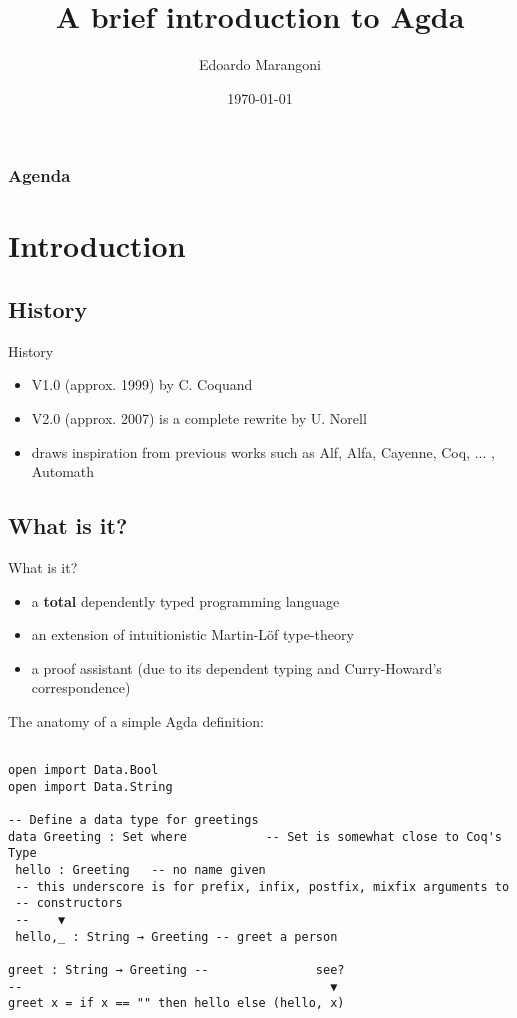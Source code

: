 \documentclass[t,aspectratio=169,9pt]{beamer}
\title{A brief introduction to Agda}
\subtitle{}%
\date{\today}
\author{Edoardo Marangoni}
\begin{document}
\frame[plain]{\titlepage}

\begin{frame}[t,plain]
	\frametitle{Agenda}
	\tableofcontents
\end{frame}

\section[intro]{Introduction}
\subsection[hist]{History}
\begin{frame}{History}
  \vfill
  \begin{itemize}
    \item {V1.0 (approx. 1999) by C. Coquand}
    \item {V2.0 (approx. 2007) is a complete rewrite by U. Norell}
    \item {draws inspiration from previous works such as Alf, Alfa, Cayenne,
      Coq, ... , Automath }
  \end{itemize}
  \vfill
\end{frame}
\subsection[what?]{What is it?}
\begin{frame}[fragile]{What is it?}
  \begin{itemize}
    \item {a {\bf total} dependently typed programming language}
    \item {an extension of intuitionistic Martin-Löf type-theory}
    \item {a proof assistant (due to its dependent typing and Curry-Howard's
      correspondence)}
  \end{itemize}
  \vfill
The anatomy of a simple Agda definition:
\begin{verbatim}

open import Data.Bool
open import Data.String

-- Define a data type for greetings
data Greeting : Set where           -- Set is somewhat close to Coq's Type
 hello : Greeting   -- no name given
 -- this underscore is for prefix, infix, postfix, mixfix arguments to
 -- constructors
 --    ▼
 hello,_ : String → Greeting -- greet a person

greet : String → Greeting --               see?
--                                           ▼
greet x = if x == "" then hello else (hello, x)
\end{verbatim}
  \vfill
\end{frame}
\end{document}
